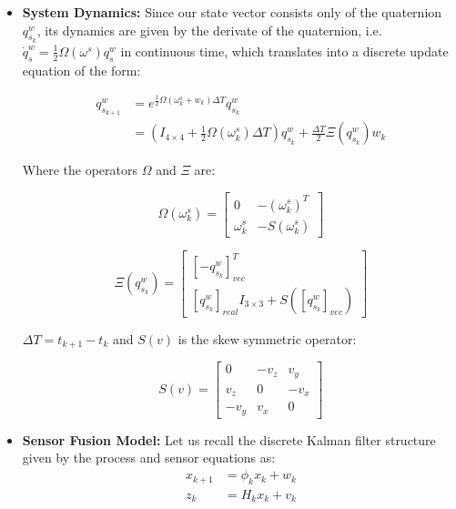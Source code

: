 \documentclass[a4paper,10pt]{article}
\begin{document}
\begin{itemize}
\item \textbf{System Dynamics:} Since our state vector consists only of the quaternion $q^w_{s_k}$, its dynamics are given by the derivate of the quaternion, i.e. $\dot{q}^w_s = \frac{1}{2}\Omega(\omega^s)q^w_s$ in continuous time, which translates into a discrete update equation of the form:

\begin{align}
 q^w_{s_{k+1}} &= e^{\frac{1}{2}\Omega(\omega^s_k + w_k)\Delta T} q^w_{s_k} \\
         &= (I_{4\times 4} + \frac{1}{2}\Omega(\omega^s_k)\Delta T)q^w_{s_k} + \frac{\Delta T}{2}\Xi(q^w_{s_k})w_k
\end{align}

Where the operators $\Omega$ and $\Xi$ are:

\begin{equation}
 \Omega(\omega^s_k) = \left[\begin{matrix}
                      0	        &  -(\omega^s_k)^T\\
                   \omega^s_k   &  -S(\omega^s_k)
                  \end{matrix}\right]
\end{equation}

\begin{equation}
 \Xi(q^w_{s_k}) = \left[\begin{matrix}
                   [-q^w_{s_k}]^T_{vec} \\
                    [q^w_{s_k}]_{real} I_{3\times3} + S([q^w_{s_k}]_{vec})
                  \end{matrix}\right]
\end{equation}

$\Delta T = t_{k+1} - t_k$ and $S(v)$ is the skew symmetric operator:

\begin{equation}
 S(v) = \left[\begin{matrix}
               0    &  -v_z  &   v_y\\
               v_z  &   0    &  -v_x\\
              -v_y  &   v_x  &    0 
              \end{matrix}\right]
\end{equation}



\item \textbf{Sensor Fusion Model: } Let us recall the discrete Kalman filter structure given by the process and sensor equations as:
\begin{align}
 x_{k+1} &= \phi_k x_k + w_k\\
 z_k     &= H_k x_k + v_k
\end{align}


\end{itemize}
\end{document}
